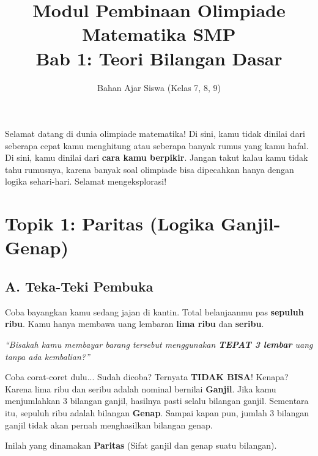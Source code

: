 \documentclass[11pt,a4paper]{article}
\title{\textbf{Modul Pembinaan Olimpiade Matematika SMP\\Bab 1: Teori Bilangan Dasar}}
\author{Bahan Ajar Siswa (Kelas 7, 8, 9)}
\date{}
\begin{document}
\maketitle
\thispagestyle{empty}

\begin{tcolorbox}[colback=blue!5!white,colframe=blue!75!black,title=Halo Calon Sang Juara!]
Selamat datang di dunia olimpiade matematika! Di sini, kamu tidak dinilai dari seberapa cepat kamu menghitung atau seberapa banyak rumus yang kamu hafal. Di sini, kamu dinilai dari \textbf{cara kamu berpikir}. Jangan takut kalau kamu tidak tahu rumusnya, karena banyak soal olimpiade bisa dipecahkan hanya dengan logika sehari-hari. Selamat mengeksplorasi!
\end{tcolorbox}

\vspace{0.5cm}

\section*{Topik 1: Paritas (Logika Ganjil-Genap)}

\subsection*{A. Teka-Teki Pembuka}
Coba bayangkan kamu sedang jajan di kantin. Total belanjaanmu pas \textbf{sepuluh ribu}. Kamu hanya membawa uang lembaran \textbf{lima ribu} dan \textbf{seribu}. 
\begin{center}
\textit{``Bisakah kamu membayar barang tersebut menggunakan \textbf{TEPAT 3 lembar} uang tanpa ada kembalian?''}
\end{center}

Coba corat-coret dulu... 
Sudah dicoba? Ternyata \textbf{TIDAK BISA}! Kenapa? 
Karena lima ribu dan seribu adalah nominal bernilai \textbf{Ganjil}. Jika kamu menjumlahkan 3 bilangan ganjil, hasilnya pasti selalu bilangan ganjil. Sementara itu, sepuluh ribu adalah bilangan \textbf{Genap}. Sampai kapan pun, jumlah 3 bilangan ganjil tidak akan pernah menghasilkan bilangan genap. 

Inilah yang dinamakan \textbf{Paritas} (Sifat ganjil dan genap suatu bilangan).
\end{document}
